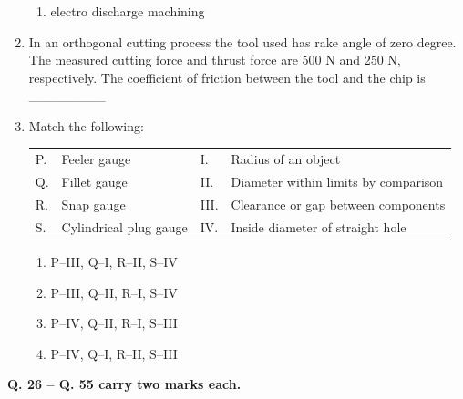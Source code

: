 \documentclass[journal,11pt,onecolumn]{IEEEtran}
\begin{document}
\begin{enumerate}
\begin{enumerate}
              \item electro discharge machining

          \end{enumerate}

    \item In an orthogonal cutting process the tool used has rake angle of zero degree. The measured cutting force and thrust force are 500 N and 250 N, respectively. The coefficient of friction between the tool and the chip is \_\_\_\_\_\_\_\_

    \item Match the following:

          \begin{table}[H]
              \centering
              \begin{tabular}{|l|l|l|l|}
                  \hline
                  P. & Feeler gauge           & I.   & Radius of an object                  \\
                  Q. & Fillet gauge           & II.  & Diameter within limits by comparison \\
                  R. & Snap gauge             & III. & Clearance or gap between components  \\
                  S. & Cylindrical plug gauge & IV.  & Inside diameter of straight hole     \\
                  \hline
              \end{tabular}
              \label{t25}
          \end{table}

          \begin{enumerate}

              \item P–III, Q–I, R–II, S–IV

              \item P–III, Q–II, R–I, S–IV

              \item P–IV, Q–II, R–I, S–III

              \item P–IV, Q–I, R–II, S–III

          \end{enumerate}

\end{enumerate}

\normalsize\textbf{Q. 26 – Q. 55 carry two marks each.}\\
\end{document}
